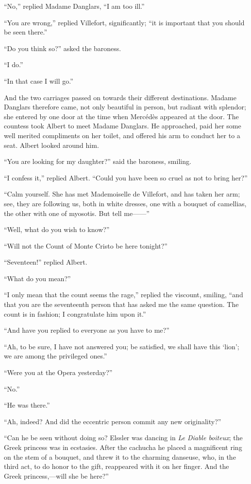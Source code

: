 “No,” replied Madame Danglars, “I am too ill.”

“You are wrong,” replied Villefort, significantly; “it is important
that you should be seen there.”

“Do you think so?” asked the baroness.

“I do.”

“In that case I will go.”

And the two carriages passed on towards their different destinations.
Madame Danglars therefore came, not only beautiful in person, but
radiant with splendor; she entered by one door at the time when
Mercédès appeared at the door. The countess took Albert to meet Madame
Danglars. He approached, paid her some well merited compliments on her
toilet, and offered his arm to conduct her to a seat. Albert looked
around him.

“You are looking for my daughter?” said the baroness, smiling.

“I confess it,” replied Albert. “Could you have been so cruel as not to
bring her?”

“Calm yourself. She has met Mademoiselle de Villefort, and has taken
her arm; see, they are following us, both in white dresses, one with a
bouquet of camellias, the other with one of myosotis. But tell me——”

“Well, what do you wish to know?”

“Will not the Count of Monte Cristo be here tonight?”

“Seventeen!” replied Albert.

“What do you mean?”

“I only mean that the count seems the rage,” replied the viscount,
smiling, “and that you are the seventeenth person that has asked me the
same question. The count is in fashion; I congratulate him upon it.”

“And have you replied to everyone as you have to me?”

“Ah, to be sure, I have not answered you; be satisfied, we shall have
this ‘lion’; we are among the privileged ones.”

“Were you at the Opera yesterday?”

“No.”

“He was there.”

“Ah, indeed? And did the eccentric person commit any new originality?”

“Can he be seen without doing so? Elssler was dancing in \textit{Le Diable
boiteux}; the Greek princess was in ecstasies. After the cachucha he
placed a magnificent ring on the stem of a bouquet, and threw it to the
charming danseuse, who, in the third act, to do honor to the gift,
reappeared with it on her finger. And the Greek princess,—will she be
here?”


